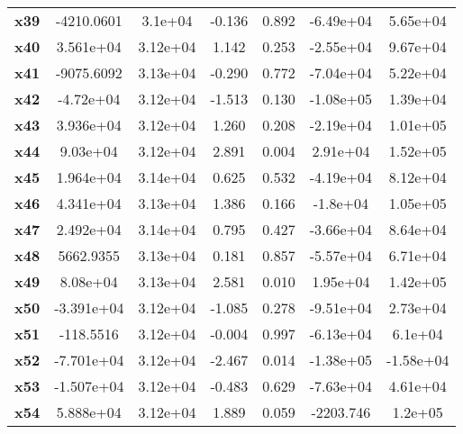 \documentclass{article}
\begin{document}
\begin{center}
{\begin{tabular}{lcccccc}
\textbf{x39}   &   -4210.0601  &      3.1e+04     &    -0.136  &         0.892        &    -6.49e+04    &     5.65e+04     \\
\textbf{x40}   &    3.561e+04  &     3.12e+04     &     1.142  &         0.253        &    -2.55e+04    &     9.67e+04     \\
\textbf{x41}   &   -9075.6092  &     3.13e+04     &    -0.290  &         0.772        &    -7.04e+04    &     5.22e+04     \\
\textbf{x42}   &    -4.72e+04  &     3.12e+04     &    -1.513  &         0.130        &    -1.08e+05    &     1.39e+04     \\
\textbf{x43}   &    3.936e+04  &     3.12e+04     &     1.260  &         0.208        &    -2.19e+04    &     1.01e+05     \\
\textbf{x44}   &     9.03e+04  &     3.12e+04     &     2.891  &         0.004        &     2.91e+04    &     1.52e+05     \\
\textbf{x45}   &    1.964e+04  &     3.14e+04     &     0.625  &         0.532        &    -4.19e+04    &     8.12e+04     \\
\textbf{x46}   &    4.341e+04  &     3.13e+04     &     1.386  &         0.166        &     -1.8e+04    &     1.05e+05     \\
\textbf{x47}   &    2.492e+04  &     3.14e+04     &     0.795  &         0.427        &    -3.66e+04    &     8.64e+04     \\
\textbf{x48}   &    5662.9355  &     3.13e+04     &     0.181  &         0.857        &    -5.57e+04    &     6.71e+04     \\
\textbf{x49}   &     8.08e+04  &     3.13e+04     &     2.581  &         0.010        &     1.95e+04    &     1.42e+05     \\
\textbf{x50}   &   -3.391e+04  &     3.12e+04     &    -1.085  &         0.278        &    -9.51e+04    &     2.73e+04     \\
\textbf{x51}   &    -118.5516  &     3.12e+04     &    -0.004  &         0.997        &    -6.13e+04    &      6.1e+04     \\
\textbf{x52}   &   -7.701e+04  &     3.12e+04     &    -2.467  &         0.014        &    -1.38e+05    &    -1.58e+04     \\
\textbf{x53}   &   -1.507e+04  &     3.12e+04     &    -0.483  &         0.629        &    -7.63e+04    &     4.61e+04     \\
\textbf{x54}   &    5.888e+04  &     3.12e+04     &     1.889  &         0.059        &    -2203.746    &      1.2e+05     \\

\end{tabular}}
\end{center}
\end{document}
